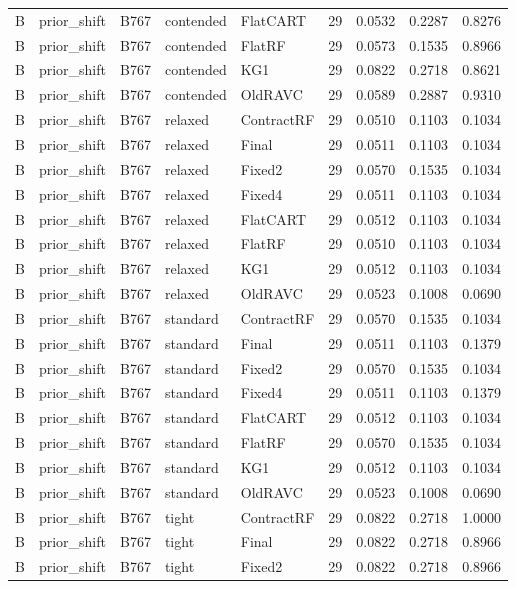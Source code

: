 \begin{longtable}{@{}lllllllll@{}}
B & prior\_shift & B767 & contended & FlatCART & 29 & 0.0532 & 0.2287 & 0.8276\\
B & prior\_shift & B767 & contended & FlatRF & 29 & 0.0573 & 0.1535 & 0.8966\\
B & prior\_shift & B767 & contended & KG1 & 29 & 0.0822 & 0.2718 & 0.8621\\
B & prior\_shift & B767 & contended & OldRAVC & 29 & 0.0589 & 0.2887 & 0.9310\\
B & prior\_shift & B767 & relaxed & ContractRF & 29 & 0.0510 & 0.1103 & 0.1034\\
B & prior\_shift & B767 & relaxed & Final & 29 & 0.0511 & 0.1103 & 0.1034\\
B & prior\_shift & B767 & relaxed & Fixed2 & 29 & 0.0570 & 0.1535 & 0.1034\\
B & prior\_shift & B767 & relaxed & Fixed4 & 29 & 0.0511 & 0.1103 & 0.1034\\
B & prior\_shift & B767 & relaxed & FlatCART & 29 & 0.0512 & 0.1103 & 0.1034\\
B & prior\_shift & B767 & relaxed & FlatRF & 29 & 0.0510 & 0.1103 & 0.1034\\
B & prior\_shift & B767 & relaxed & KG1 & 29 & 0.0512 & 0.1103 & 0.1034\\
B & prior\_shift & B767 & relaxed & OldRAVC & 29 & 0.0523 & 0.1008 & 0.0690\\
B & prior\_shift & B767 & standard & ContractRF & 29 & 0.0570 & 0.1535 & 0.1034\\
B & prior\_shift & B767 & standard & Final & 29 & 0.0511 & 0.1103 & 0.1379\\
B & prior\_shift & B767 & standard & Fixed2 & 29 & 0.0570 & 0.1535 & 0.1034\\
B & prior\_shift & B767 & standard & Fixed4 & 29 & 0.0511 & 0.1103 & 0.1379\\
B & prior\_shift & B767 & standard & FlatCART & 29 & 0.0512 & 0.1103 & 0.1034\\
B & prior\_shift & B767 & standard & FlatRF & 29 & 0.0570 & 0.1535 & 0.1034\\
B & prior\_shift & B767 & standard & KG1 & 29 & 0.0512 & 0.1103 & 0.1034\\
B & prior\_shift & B767 & standard & OldRAVC & 29 & 0.0523 & 0.1008 & 0.0690\\
B & prior\_shift & B767 & tight & ContractRF & 29 & 0.0822 & 0.2718 & 1.0000\\
B & prior\_shift & B767 & tight & Final & 29 & 0.0822 & 0.2718 & 0.8966\\
B & prior\_shift & B767 & tight & Fixed2 & 29 & 0.0822 & 0.2718 & 0.8966\\

\end{longtable}
